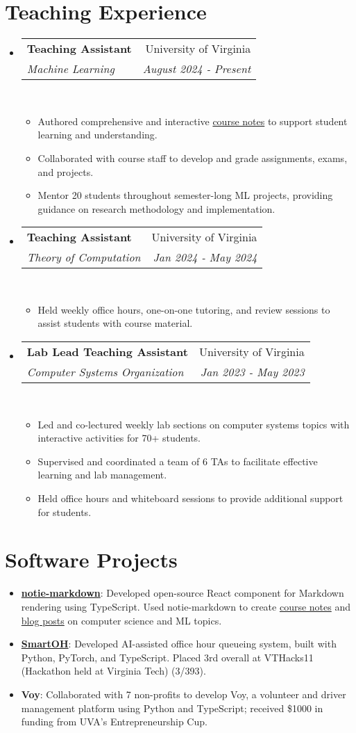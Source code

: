 \documentclass[letterpaper,11pt]{article}
\makeatletter
\newcommand{\linkhref}[2]{\textcolor{linkblue}{\href{#1}{#2}}}
\newcommand{\Date}[1]{\textit{\small #1}}
\newcommand{\resumeSubheading}[4]{
  \item
    \begin{tabular*}{0.9798\textwidth}{l@{\extracolsep{\fill}}r} %
      \textbf{#1} & #2 \\
      \textit{\small#3} & \Date{#4} \\
    \end{tabular*}\
}
\makeatother
\begin{document}
\section{Teaching Experience}
\begin{itemize}
  \resumeSubheading{Teaching Assistant}{University of Virginia}
  {Machine Learning}{August 2024 - Present}
  \begin{itemize}
    \item Authored comprehensive and interactive \linkhref{https://www.brandonyifanyang.com/notes/ml}{course notes} to support student learning and understanding.
    \item Collaborated with course staff to develop and grade assignments, exams, and projects.
    \item Mentor 20 students throughout semester-long ML projects, providing guidance on research methodology and implementation.
  \end{itemize}
  \resumeSubheading{Teaching Assistant}{University of Virginia}
  {Theory of Computation}{Jan 2024 - May 2024}
  \begin{itemize}
    \item Held weekly office hours, one-on-one tutoring, and review sessions to assist students with course material.
  \end{itemize}
  \resumeSubheading{Lab Lead Teaching Assistant}{University of Virginia}
  {Computer Systems Organization}{Jan 2023 - May 2023}
  \begin{itemize}
    \item Led and co-lectured weekly lab sections on computer systems topics with interactive activities for 70+ students.
    \item Supervised and coordinated a team of 6 TAs to facilitate effective learning and lab management.
    \item Held office hours and whiteboard sessions to provide additional support for students.
  \end{itemize}
\end{itemize}

\section{Software Projects}
\begin{itemize}
  \item \textbf{\linkhref{https://notie-markdown.vercel.app/}{notie-markdown}}: Developed open-source React component for Markdown rendering using TypeScript. Used notie-markdown to create \linkhref{https://www.brandonyifanyang.com/notes}{course notes} and \linkhref{https://www.brandonyifanyang.com/blog}{blog posts} on computer science and ML topics.
  \item \textbf{\linkhref{https://github.com/ewei2406/SmartOH}{SmartOH}}: Developed AI-assisted office hour queueing system, built with Python, PyTorch, and TypeScript. Placed 3rd overall at VTHacks11 (Hackathon held at Virginia Tech) (3/393).
  \item \textbf{Voy}: Collaborated with 7 non-profits to develop Voy, a volunteer and driver management platform using Python and TypeScript; received \$1000 in funding from UVA's Entrepreneurship Cup.
\end{itemize}
\end{document}

